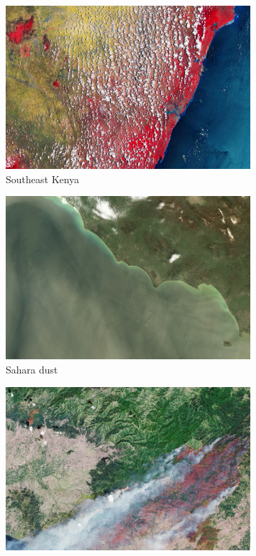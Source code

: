 \documentclass[conference]{IEEEtran}
\begin{document}
\begin{figure}
  \begin{subfigure}{.32\linewidth}
    \includegraphics[width=\linewidth]{figures/Earth_from_Space_Southeast_Kenya}
    \caption{Southeast Kenya}
    \label{fig:sentinel_kenya}
  \end{subfigure}
  \hfill
  \begin{subfigure}{.32\linewidth}
    \includegraphics[width=\linewidth]{figures/Saharan_dust_plume}
    \caption{Sahara dust}
    \label{fig:sentinel_sahara}
  \end{subfigure}
  \hfill
  \begin{subfigure}{.32\linewidth}
    \includegraphics[width=\linewidth]{figures/Wildfires_continue_to_rage_in_Greece}

\end{subfigure}
\end{figure}
\end{document}
